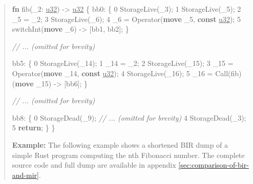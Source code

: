 \documentclass[
  11pt,
  twoside,symmetric]{report}
\newenvironment{Shaded}{}{}
\newcommand{\CommentTok}[1]{\textit{#1}}
\newcommand{\ControlFlowTok}[1]{\textbf{#1}}
\newcommand{\DataTypeTok}[1]{\underline{#1}}
\newcommand{\DecValTok}[1]{#1}
\newcommand{\KeywordTok}[1]{\textbf{#1}}
\newcommand{\NormalTok}[1]{#1}
\newcommand{\OperatorTok}[1]{#1}
\begin{document}
\begin{quote}
\begin{Shaded}
\begin{Highlighting}[]
\KeywordTok{fn}\NormalTok{ fib(\_2}\OperatorTok{:} \DataTypeTok{u32}\NormalTok{) }\OperatorTok{{-}\textgreater{}} \DataTypeTok{u32} \OperatorTok{\{}
\NormalTok{    bb0}\OperatorTok{:} \OperatorTok{\{}
    \DecValTok{0}\NormalTok{    StorageLive(\_3)}\OperatorTok{;}
    \DecValTok{1}\NormalTok{    StorageLive(\_5)}\OperatorTok{;}
    \DecValTok{2}\NormalTok{    \_5 }\OperatorTok{=}\NormalTok{ \_2}\OperatorTok{;}
    \DecValTok{3}\NormalTok{    StorageLive(\_6)}\OperatorTok{;}
    \DecValTok{4}\NormalTok{    \_6 }\OperatorTok{=}\NormalTok{ Operator(}\KeywordTok{move}\NormalTok{ \_5}\OperatorTok{,} \KeywordTok{const} \DataTypeTok{u32}\NormalTok{)}\OperatorTok{;}
    \DecValTok{5}\NormalTok{    switchInt(}\KeywordTok{move}\NormalTok{ \_6) }\OperatorTok{{-}\textgreater{}}\NormalTok{ [bb1}\OperatorTok{,}\NormalTok{ bb2]}\OperatorTok{;}
    \OperatorTok{\}}

   \CommentTok{// ... (omitted for brevity) }

\NormalTok{    bb5}\OperatorTok{:} \OperatorTok{\{}
    \DecValTok{0}\NormalTok{    StorageLive(\_14)}\OperatorTok{;}
    \DecValTok{1}\NormalTok{    \_14 }\OperatorTok{=}\NormalTok{ \_2}\OperatorTok{;}
    \DecValTok{2}\NormalTok{    StorageLive(\_15)}\OperatorTok{;}
    \DecValTok{3}\NormalTok{    \_15 }\OperatorTok{=}\NormalTok{ Operator(}\KeywordTok{move}\NormalTok{ \_14}\OperatorTok{,} \KeywordTok{const} \DataTypeTok{u32}\NormalTok{)}\OperatorTok{;}
    \DecValTok{4}\NormalTok{    StorageLive(\_16)}\OperatorTok{;}
    \DecValTok{5}\NormalTok{    \_16 }\OperatorTok{=}\NormalTok{ Call(fib)(}\KeywordTok{move}\NormalTok{ \_15) }\OperatorTok{{-}\textgreater{}}\NormalTok{ [bb6]}\OperatorTok{;}
    \OperatorTok{\}}

    \CommentTok{// ... (omitted for brevity)}

\NormalTok{    bb8}\OperatorTok{:} \OperatorTok{\{}
    \DecValTok{0}\NormalTok{    StorageDead(\_9)}\OperatorTok{;}
    \CommentTok{// ... (omitted for brevity) }
    \DecValTok{4}\NormalTok{    StorageDead(\_3)}\OperatorTok{;}
    \DecValTok{5}    \ControlFlowTok{return}\OperatorTok{;}
    \OperatorTok{\}}
\OperatorTok{\}}
\end{Highlighting}
\end{Shaded}

\textbf{Example:} The following example shows a shortened BIR dump of a
simple Rust program computing the nth Fibonacci number. The complete
source code and full dump are available in appendix
\ref{sec:comparison-of-bir-and-mir}.
\end{quote}
\end{document}
